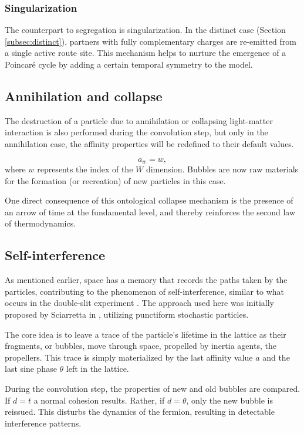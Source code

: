 \documentclass[12pt,english]{article}
\begin{document}
\subsubsection{Singularization}
The counterpart to segregation is singularization. In the distinct case (Section \ref{subsec:distinct}), partners with fully complementary charges are re-emitted from a single active route site. This mechanism helps to nurture the emergence of a Poincaré cycle by adding a certain temporal symmetry to the model.

\subsection{Annihilation and collapse}

The destruction of a particle due to annihilation or collapsing light-matter interaction is also performed during the convolution step, but only in the annihilation case, the affinity properties will be redefined to their default values.

\[
a_w=w,
\]
where $w$ represents the index of the $W$ dimension. Bubbles are now raw materials for the formation (or recreation) of new particles in this case.

One direct consequence of this ontological collapse mechanism is the presence of an arrow of time at the fundamental level, and thereby reinforces the second law of thermodynamics.

\subsection{Self-interference\label{subsec:Interference}}

As mentioned earlier, space has a memory that records the paths taken by the particles, contributing to the phenomenon of self-interference, similar to what occurs in the double-slit experiment \cite{feynman-2}. The approach used here was initially proposed by Sciarretta in \cite{sciarretta}, utilizing punctiform stochastic particles.

The core idea is to leave a trace of the particle's lifetime in the lattice as their fragments, or bubbles, move through space, propelled by inertia agents, the propellers. This trace is simply materialized by the last affinity value $a$ and the last sine phase $\theta$ left in the lattice.

During the convolution step, the properties of new and old bubbles are compared. If $d=t$ a normal cohesion results. Rather, if $d=\theta$, only the new bubble is reissued. This disturbs the dynamics of the fermion, resulting in detectable interference patterns. 
\end{document}
